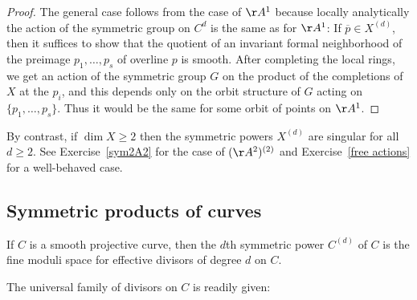 \begin{proof}
 The general case follows from the case of $\AA^{1}$ because locally analytically the action of the symmetric group on $C^d$ is the same as for $\AA^1$: If  $\overline p \in X^{(d)}$, then it suffices to
 show that the quotient of an invariant formal neighborhood of the preimage $p_1,\dots, p_s$ of
 overline $p$ is smooth. After completing the local rings, we get an action of the symmetric group
 $G$ on the product of the completions of $X$ at the $p_i$, and this depends only on the orbit
 structure of $G$ acting on $\{p_1,\dots, p_s\}$. Thus it would be the same for some orbit of
 points on $\AA^1$.
 \end{proof}

By contrast, if $\dim X \geq 2$ then the symmetric powers $X^{(d)}$ are singular for all $d \geq 2$.
See Exercise~\ref{sym2A2} for the case of $(\AA^2)^{(2)}$ and Exercise~\ref{free actions} for a well-behaved case.




\subsection{Symmetric products of curves}

\begin{fact}
If $C$ is a smooth projective curve, then the $d$th symmetric power $C^{(d)}$ of $C$ is the fine moduli space for effective divisors of degree $d$ on $C$.
\end{fact}

The universal family of divisors on $C$ is readily given:

%
%
 
